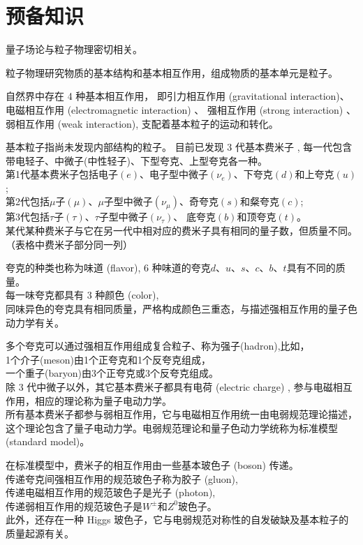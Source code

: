 \section{预备知识}

量子场论与粒子物理密切相关。

粒子物理研究物质的基本结构和基本相互作用，组成物质的基本单元是粒子。

自然界中存在 4 种基本相互作用，
即引力相互作用 (gravitational interaction)、
电磁相互作用 (electromagnetic interaction) 、 
强相互作用 (strong interaction) 、
弱相互作用 (weak interaction),
支配着基本粒子的运动和转化。

基本粒子指尚未发现内部结构的粒子。
目前已发现 3 代基本费米子 ,
每一代包含带电轻子、中微子(中性轻子)、下型夸克、上型夸克各一种。
\\第1代基本费米子包括电子$(e)$、电子型中微子$(\nu_e)$、下夸克$(d)$和上夸克$(u)$ ;
\\第2代包括$\mu$子$(\mu)$、$\mu$子型中微子$(\nu_\mu)$、奇夸克$(s)$和粲夸克$(c)$;
\\第3代包括$\tau$子$(\tau)$、$\tau$子型中微子$(\nu_\tau)$、 底夸克$(b)$和顶夸克$(t)$。
\\某代某种费米子与它在另一代中相对应的费米子具有相同的量子数，但质量不同。（表格中费米子部分同一列）

夸克的种类也称为味道 (flavor), 6 种味道的夸克$d$、$u$、$s$、$c$、$b$、$t$具有不同的质量。
\\每一味夸克都具有 3 种颜色 (color),
\\同味异色的夸克具有相同质量，严格构成颜色三重态，与描述强相互作用的量子色动力学有关。

多个夸克可以通过强相互作用组成复合粒子、称为强子(hadron),比如，
\\1个介子(meson)由1个正夸克和1个反夸克组成，
\\一个重子(baryon)由3个正夸克或3个反夸克组成。
\\除 3 代中微子以外，其它基本费米子都具有电荷 (electric charge) , 参与电磁相互作用，相应的理论称为量子电动力学。
\\所有基本费米子都参与弱相互作用，它与电磁相互作用统一由电弱规范理论描述，这个理论包含了量子电动力学。电弱规范理论和量子色动力学统称为标准模型 (standard model)。

在标准模型中，费米子的相互作用由一些基本玻色子 (boson) 传递。
\\传递夸克间强相互作用的规范玻色子称为胶子 (gluon),
\\传递电磁相互作用的规范玻色子是光子 (photon),
\\传递弱相互作用的规范玻色子是$W^\pm$和$Z^0$玻色子。
\\此外，还存在一种 Higgs 玻色子，它与电弱规范对称性的自发破缺及基本粒子的质量起源有关。

